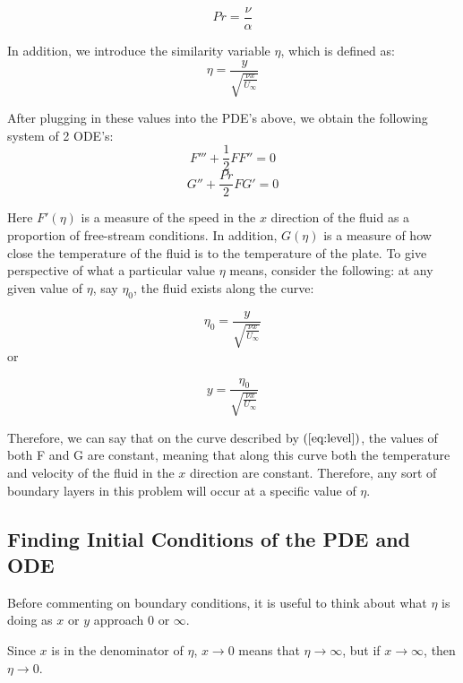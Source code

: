 \documentclass[12pt]{article}\pagestyle{myheadings}
\theoremstyle{plain}
\begin{document}
{\[Pr = \frac{\nu}{\alpha} \]}

In addition, we introduce the similarity variable $\eta$, which is defined as: \\

\begin{equation}\label{eq:eta}
\eta = \frac{y}{\sqrt{\frac{\nu x}{U_{\infty}}}}
\end{equation}

After plugging in these values into the PDE's above, we obtain the following system of 2 ODE's:
\begin{equation}\label{eq:FPDE}
F''' + \frac{1}{2} FF'' = 0  
\end{equation}
\begin{equation}\label{eq:GPDE}
G'' + \frac{Pr}{2} FG' = 0 
\end{equation}



Here $F'(\eta)$ is a measure of the speed in the $x$ direction of the fluid as a proportion of free-stream conditions. In addition, $G(\eta)$ is a measure of how close the temperature of the fluid is to the temperature of the plate. To give perspective of what a particular value $\eta$ means, consider the following: at any given value of $\eta$, say $\eta_{0}$, the fluid exists along the curve:

{\[ \eta_{0} = \frac{y}{\sqrt{\frac{\nu x}{U_{\infty}}}} \]} or

\begin{equation}\label{eq:level}
 y = \frac{\eta_{0}}{\sqrt{\frac{\nu x}{U_{\infty}}}} 
\end{equation}

Therefore, we can say that on the curve described by $(\ref{eq:level})$, the values of both F and G are constant, meaning that along this curve both the temperature and velocity of the fluid in the $x$ direction are constant. Therefore, any sort of boundary layers in this problem will occur at a specific value of $\eta$.

\subsection{Finding Initial Conditions of the PDE and ODE}

Before commenting on boundary conditions, it is useful to think about what $\eta$ is doing as $x$ or $y$ approach 0 or $\infty$.

Since $x$ is in the denominator of $\eta$, $x \rightarrow 0$ means that $\eta \rightarrow \infty$, but if $x \rightarrow \infty$, then $\eta \rightarrow 0$.
\end{document}
